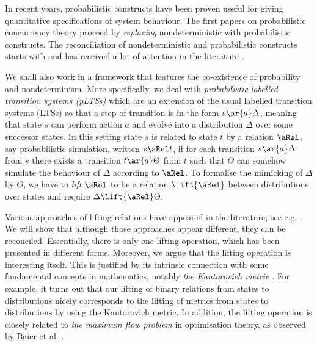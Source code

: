 \documentclass{article}
\begin{document}
In recent years, probabilistic constructs have been proven useful
for giving quantitative specifications of system behaviour. The
first papers on probabilistic concurrency theory
\cite{GJS90,Chr90,larsenskou} proceed by \emph{replacing}
nondeterministic with probabilistic constructs. The reconciliation
of nondeterministic and probabilistic constructs starts with
\cite{HJ90} and has received a lot of attention in the literature
\cite{WL92,SL94,Lowe95,Seg95,HK97,MM97,BS01,JW02,mislove03,CIN05,TKP05,MM07,
DGHMZ07,DGMZ07,DGHM08,DGHM09}.

We shall also work in a framework that features the co-existence of
probability and nondeterminism. More specifically, we deal with
\emph{probabilistic labelled transition systems (pLTSs)}
\cite{DGHMZ07} which are an extension of the usual labelled
transition systems (LTSs) so that a step of transition is in the
form $s\ar{a}\Delta$, meaning that state $s$ can perform action $a$
and evolve into a distribution $\Delta$ over some successor states.
In this setting state $s$ is related to state $t$ by a relation
$\aRel$, say probabilistic simulation, written $s\aRel t$, if for
each transition $s\ar{a}\Delta$ from $s$ there exists a transition
$t\ar{a}\Theta$ from $t$ such that $\Theta$ can somehow simulate the
behaviour of $\Delta$ according to $\aRel$. To formalise the
mimicking of $\Delta$ by $\Theta$, we have to \emph{lift} $\aRel$ to
be a relation $\lift{\aRel}$ between distributions over states and
require $\Delta\lift{\aRel}\Theta$.

Various approaches of lifting relations have appeared in the
literature; see e.g. \cite{LS91,SL94,DGHMZ07,DD07,DGHM09}. We will
show that although those approaches appear different, they can be
reconciled. Essentially, there is only one lifting operation, which
has been presented in different forms. Moreover, we argue that the
lifting operation is interesting itself. This is justified by its
intrinsic connection with some fundamental concepts in mathematics,
notably \emph{the Kantorovich metric} \cite{Kan42}. For example, it
turns out that our lifting of binary relations from states to
distributions nicely corresponds to the lifting of metrics from
states to distributions by using the Kantorovich metric. In
addition, the lifting operation is closely related to \emph{the
maximum flow problem} in optimisation theory, as observed by Baier
et al. \cite{BEM00}.
\end{document}
